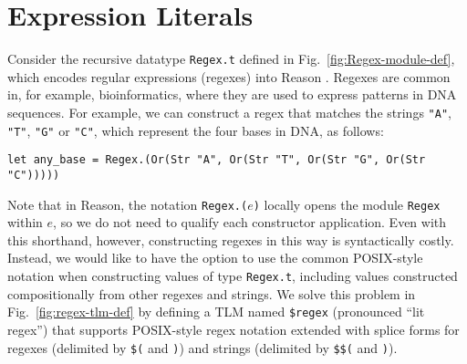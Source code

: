 \documentclass[acmsmall]{acmart}
\newcommand{\li}[1]{\lstinline[basicstyle=\ttfamily\fontsize{9pt}{1em}\selectfont]{#1}}
\begin{document}
\section{Expression Literals}
\label{sec:setlms}

Consider the recursive datatype \li{Regex.t} defined in Fig.~\ref{fig:Regex-module-def}, which encodes {regular expressions} (regexes) into Reason \cite{Thompson:1968:PTR:363347.363387}. Regexes are  common in, for example, bioinformatics, where they are used to express patterns in DNA sequences. For example, we can construct a regex that matches the strings \li{"A"}, \li{"T"}, \li{"G"} or \li{"C"}, which represent the four bases in DNA, as follows:
\begin{lstlisting}[numbers=none]
  let any_base = Regex.(Or(Str "A", Or(Str "T", Or(Str "G", Or(Str "C")))))
\end{lstlisting}
Note that in Reason, the notation \li{Regex.(}$e$\li{)} locally opens the module \li{Regex} within $e$, so we do not need to qualify each constructor application. Even with this shorthand, however, constructing regexes in this way is syntactically costly. Instead, we would like to have the option to use the common POSIX-style notation  \cite{STD95954} when constructing values of type \li{Regex.t}, including values constructed compositionally from other regexes and strings. 
We solve this problem in Fig.~\ref{fig:regex-tlm-def} by defining a TLM named \li{$regex} (pronounced ``lit regex'') that supports POSIX-style regex notation extended with splice forms for regexes (delimited by \li{$(} and \li{)}) and strings (delimited by \li{$$(} and \li{)}). 
\end{document}
